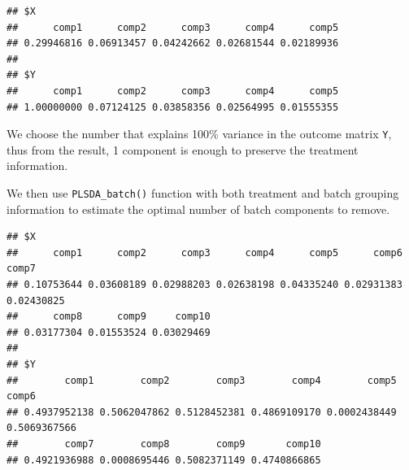 \documentclass[
]{book}
\newenvironment{Shaded}{\begin{snugshade}}{\end{snugshade}}
\newcommand{\AttributeTok}[1]{\textcolor[rgb]{0.77,0.63,0.00}{#1}}
\newcommand{\CommentTok}[1]{\textcolor[rgb]{0.56,0.35,0.01}{\textit{#1}}}
\newcommand{\DecValTok}[1]{\textcolor[rgb]{0.00,0.00,0.81}{#1}}
\newcommand{\FunctionTok}[1]{\textcolor[rgb]{0.00,0.00,0.00}{#1}}
\newcommand{\NormalTok}[1]{#1}
\newcommand{\OtherTok}[1]{\textcolor[rgb]{0.56,0.35,0.01}{#1}}
\newcommand{\SpecialCharTok}[1]{\textcolor[rgb]{0.00,0.00,0.00}{#1}}
\begin{document}
\begin{Shaded}
\end{Shaded}

\begin{verbatim}
## $X
##      comp1      comp2      comp3      comp4      comp5 
## 0.29946816 0.06913457 0.04242662 0.02681544 0.02189936 
## 
## $Y
##      comp1      comp2      comp3      comp4      comp5 
## 1.00000000 0.07124125 0.03858356 0.02564995 0.01555355
\end{verbatim}

We choose the number that explains 100\% variance in the outcome matrix \texttt{Y}, thus from the result, 1 component is enough to preserve the treatment information.

We then use \texttt{PLSDA\_batch()} function with both treatment and batch grouping information to estimate the optimal number of batch components to remove.

\begin{Shaded}
\end{Shaded}

\begin{verbatim}
## $X
##      comp1      comp2      comp3      comp4      comp5      comp6      comp7 
## 0.10753644 0.03608189 0.02988203 0.02638198 0.04335240 0.02931383 0.02430825 
##      comp8      comp9     comp10 
## 0.03177304 0.01553524 0.03029469 
## 
## $Y
##        comp1        comp2        comp3        comp4        comp5        comp6 
## 0.4937952138 0.5062047862 0.5128452381 0.4869109170 0.0002438449 0.5069367566 
##        comp7        comp8        comp9       comp10 
## 0.4921936988 0.0008695446 0.5082371149 0.4740866865
\end{verbatim}
\end{document}
